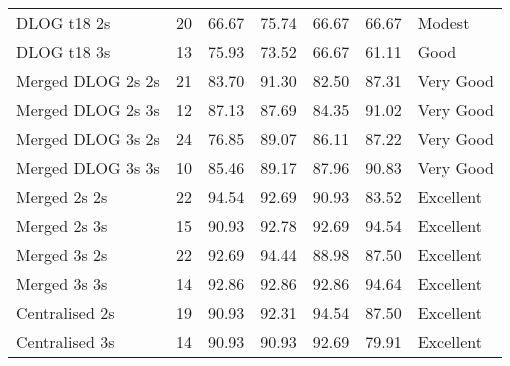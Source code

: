 \documentclass[
  12pt,
  a4paper,
]{book}
\begin{document}
\begin{longtable}[t]{lrrrrrl}
\rowcolor{gray!6}  DLOG t18 2s & 20 & 66.67 & 75.74 & 66.67 & 66.67 & Modest\\
DLOG t18 3s & 13 & 75.93 & 73.52 & 66.67 & 61.11 & Good\\
\rowcolor{gray!6}  Merged DLOG 2s 2s & 21 & 83.70 & 91.30 & 82.50 & 87.31 & Very Good\\
Merged DLOG 2s 3s & 12 & 87.13 & 87.69 & 84.35 & 91.02 & Very Good\\
\rowcolor{gray!6}  Merged DLOG 3s 2s & 24 & 76.85 & 89.07 & 86.11 & 87.22 & Very Good\\
Merged DLOG 3s 3s & 10 & 85.46 & 89.17 & 87.96 & 90.83 & Very Good\\
\rowcolor{gray!6}  Merged 2s 2s & 22 & 94.54 & 92.69 & 90.93 & 83.52 & Excellent\\
Merged 2s 3s & 15 & 90.93 & 92.78 & 92.69 & 94.54 & Excellent\\
\rowcolor{gray!6}  Merged 3s 2s & 22 & 92.69 & 94.44 & 88.98 & 87.50 & Excellent\\
Merged 3s 3s & 14 & 92.86 & 92.86 & 92.86 & 94.64 & Excellent\\
\rowcolor{gray!6}  Centralised 2s & 19 & 90.93 & 92.31 & 94.54 & 87.50 & Excellent\\
Centralised 3s & 14 & 90.93 & 90.93 & 92.69 & 79.91 & Excellent\\*
\end{longtable}
\endgroup{}
\end{document}
